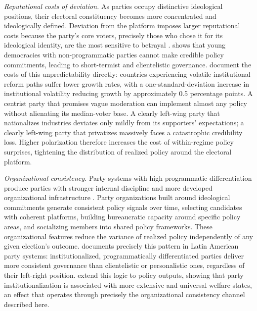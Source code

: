 \documentclass[12pt]{article}
\begin{document}
\textit{Reputational costs of deviation.} As parties occupy distinctive
ideological positions, their electoral constituency becomes more concentrated
and ideologically defined. Deviation from the platform imposes larger
reputational costs because the party's core voters, precisely those who
chose it for its ideological identity, are the most sensitive to betrayal
\citep{PerssTabellini2000}. \citet{Keefer2007} shows that young democracies
with non-programmatic parties cannot make credible policy commitments,
leading to short-termist and clientelistic governance.
\citet{BolWilliamson2019} document the costs of this unpredictability
directly: countries experiencing volatile institutional reform paths
suffer lower growth rates, with a one-standard-deviation increase in
institutional volatility reducing growth by approximately 0.5 percentage
points. A centrist party
that promises vague moderation can implement almost any policy without
alienating its median-voter base.
A clearly left-wing party that nationalizes industries deviates only mildly
from its supporters' expectations; a clearly left-wing party that privatizes
massively faces a catastrophic credibility loss. Higher polarization
therefore increases the cost of within-regime policy surprises, tightening
the distribution of realized policy around the electoral platform.

\textit{Organizational consistency.} Party systems with high programmatic
differentiation produce parties with stronger internal discipline and more
developed organizational infrastructure \citep{MainwaringScully1995,
KitscheltKselman2013}. Party
organizations built around ideological commitments generate consistent policy
signals over time, selecting candidates with coherent platforms, building
bureaucratic capacity around specific policy areas, and socializing members
into shared policy frameworks. These organizational features reduce the
variance of realized policy independently of any given election's outcome.
\citet{Mainwaring1995} documents precisely this pattern in Latin American
party systems: institutionalized, programmatically differentiated parties
deliver more consistent governance than clientelistic or personalistic ones,
regardless of their left-right position. \citet{RasmussenKnutsen2021}
extend this logic to policy outputs, showing that party
institutionalization is associated with more extensive and universal
welfare states, an effect that operates through precisely the
organizational consistency channel described here.
\end{document}
